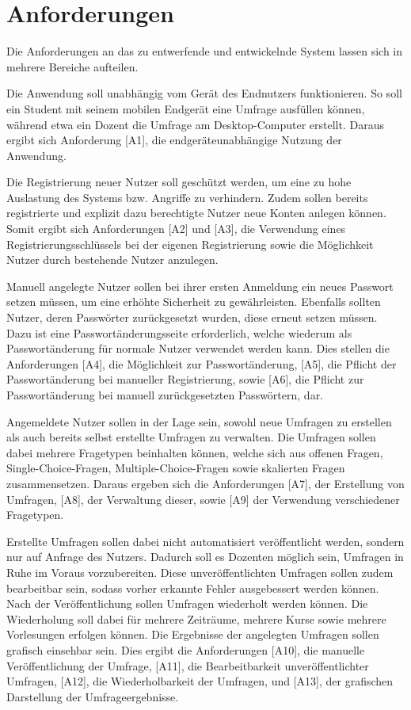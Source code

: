 \section{Anforderungen}
\label{sec:Anforderungen}

Die Anforderungen an das zu entwerfende und entwickelnde System lassen sich in mehrere Bereiche aufteilen.

Die Anwendung soll unabhängig vom Gerät des Endnutzers funktionieren.
So soll ein Student mit seinem mobilen Endgerät eine Umfrage ausfüllen können, während etwa ein Dozent die Umfrage am Desktop-Computer erstellt.
Daraus ergibt sich Anforderung [A1], die endgeräteunabhängige Nutzung der Anwendung.

Die Registrierung neuer Nutzer soll geschützt werden, um eine zu hohe Auslastung des Systems bzw. Angriffe zu verhindern.
Zudem sollen bereits registrierte und explizit dazu berechtigte Nutzer neue Konten anlegen können.
Somit ergibt sich Anforderungen [A2] und [A3], die Verwendung eines Registrierungsschlüssels bei der eigenen Registrierung sowie die Möglichkeit Nutzer durch bestehende Nutzer anzulegen.

Manuell angelegte Nutzer sollen bei ihrer ersten Anmeldung ein neues Passwort setzen müssen, um eine erhöhte Sicherheit zu gewährleisten.
Ebenfalls sollten Nutzer, deren Passwörter zurückgesetzt wurden, diese erneut setzen müssen.
Dazu ist eine Passwortänderungsseite erforderlich, welche wiederum als Passwortänderung für normale Nutzer verwendet werden kann.
Dies stellen die Anforderungen [A4], die Möglichkeit zur Passwortänderung, [A5], die Pflicht der Passwortänderung bei manueller Registrierung, sowie [A6], die Pflicht zur Passwortänderung bei manuell zurückgesetzten Passwörtern, dar.

Angemeldete Nutzer sollen in der Lage sein, sowohl neue Umfragen zu erstellen als auch bereits selbst erstellte Umfragen zu verwalten.
Die Umfragen sollen dabei mehrere Fragetypen beinhalten können, welche sich aus offenen Fragen, Single-Choice-Fragen, Multiple-Choice-Fragen sowie skalierten Fragen zusammensetzen.
Daraus ergeben sich die Anforderungen [A7], der Erstellung von Umfragen, [A8], der Verwaltung dieser, sowie [A9] der Verwendung verschiedener Fragetypen.

Erstellte Umfragen sollen dabei nicht automatisiert veröffentlicht werden, sondern nur auf Anfrage des Nutzers.
Dadurch soll es Dozenten möglich sein, Umfragen in Ruhe im Voraus vorzubereiten.
Diese unveröffentlichten Umfragen sollen zudem bearbeitbar sein, sodass vorher erkannte Fehler ausgebessert werden können.
Nach der Veröffentlichung sollen Umfragen wiederholt werden können.
Die Wiederholung soll dabei für mehrere Zeiträume, mehrere Kurse sowie mehrere Vorlesungen erfolgen können.
Die Ergebnisse der angelegten Umfragen sollen grafisch einsehbar sein.
Dies ergibt die Anforderungen [A10], die manuelle Veröffentlichung der Umfrage, [A11], die Bearbeitbarkeit unveröffentlichter Umfragen, [A12], die Wiederholbarkeit der Umfragen, und [A13], der grafischen Darstellung der Umfrageergebnisse.

